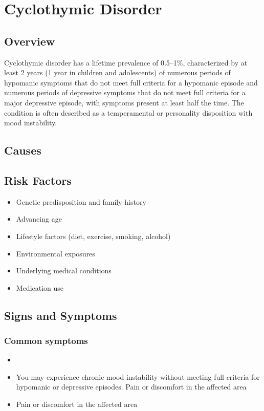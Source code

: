 \chapter{Cyclothymic Disorder}
\label{sec:Cyclothymic Disorder}

\section{Overview}
Cyclothymic disorder has a lifetime prevalence of 0.5--1\%, characterized by at least 2 years (1 year in children and adolescents) of numerous periods of hypomanic symptoms that do not meet full criteria for a hypomanic episode and numerous periods of depressive symptoms that do not meet full criteria for a major depressive episode, with symptoms present at least half the time. The condition is often described as a temperamental or personality disposition with mood instability.
\section{Causes}
\section{Risk Factors}

\begin{itemize}[noitemsep]
  \item Genetic predisposition and family history
  \item Advancing age
  \item Lifestyle factors (diet, exercise, smoking, alcohol)
  \item Environmental exposures
  \item Underlying medical conditions
  \item Medication use
\end{itemize}
\section{Signs and Symptoms}

\subsection{Common symptoms}
\begin{itemize}[noitemsep]
  \item \item You may experience chronic mood instability without meeting full criteria for hypomanic or depressive episodes. Pain or discomfort in the affected area    \item Pain or discomfort in the affected area
  \end{itemize}

